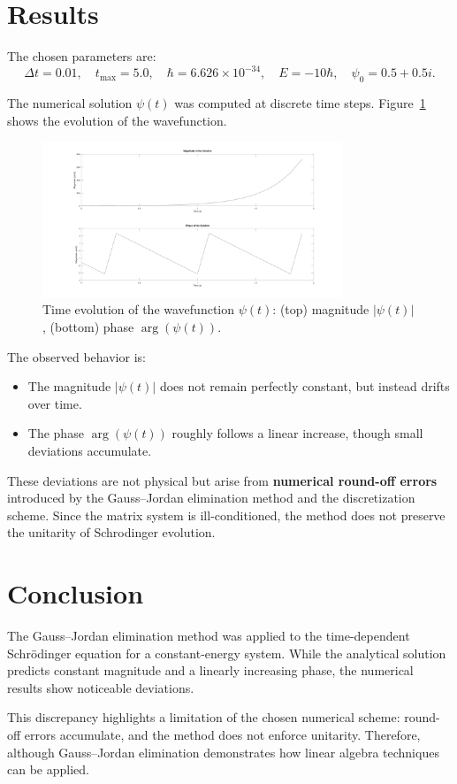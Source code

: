 \section*{Results} 
The chosen parameters are:
\[
\Delta t = 0.01, \quad t_{\max} = 5.0, \quad \hbar = 6.626 \times 10^{-34}, \quad E = -10\hbar, \quad \psi_0 = 0.5 + 0.5i.
\]

The numerical solution $\psi(t)$ was computed at discrete time steps. Figure~\ref{fig:schrodinger} shows the evolution of the wavefunction.

\begin{figure}[h!]
  \centering
  \includegraphics[width=0.8\textwidth]{a5.jpg}
  \caption{Time evolution of the wavefunction $\psi(t)$: (top) magnitude $|\psi(t)|$, (bottom) phase $\arg(\psi(t))$.}
  \label{fig:schrodinger}
\end{figure}

The observed behavior is:
\begin{itemize}
  \item The magnitude $|\psi(t)|$ does not remain perfectly constant, but instead drifts over time.
  \item The phase $\arg(\psi(t))$ roughly follows a linear increase, though small deviations accumulate.
\end{itemize}

These deviations are not physical but arise from \textbf{numerical round-off errors} introduced by the Gauss--Jordan elimination method and the discretization scheme. Since the matrix system is ill-conditioned, the method does not preserve the unitarity of Schrodinger evolution.

\section*{Conclusion} 
The Gauss--Jordan elimination method was applied to the time-dependent Schrödinger equation for a constant-energy system. While the analytical solution predicts constant magnitude and a linearly increasing phase, the numerical results show noticeable deviations.  

This discrepancy highlights a limitation of the chosen numerical scheme: round-off errors accumulate, and the method does not enforce unitarity. Therefore, although Gauss--Jordan elimination demonstrates how linear algebra techniques can be applied.
